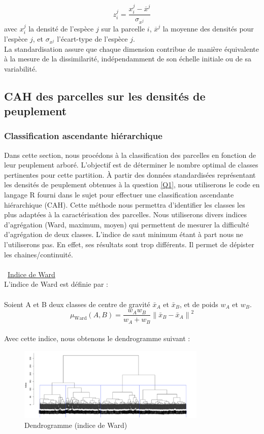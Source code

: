 \documentclass{article}
\begin{document}
\[
z_i^j = \frac{x_i^j - \overline{x}^j}{\sigma_{x^j}}
\]
avec \( x_i^j \) la densité de l’espèce \( j \) sur la parcelle \( i \), \( \overline{x}^j \) la moyenne des densités pour l’espèce \( j \), et \( \sigma_{x^j} \) l’écart-type de l’espèce \( j \).\\
La standardisation assure que chaque dimension contribue de manière équivalente à la mesure de la dissimilarité, indépendamment de son échelle initiale ou de sa variabilité.
\subsection{CAH des parcelles sur les densités de peuplement}
\subsubsection{Classification ascendante hiérarchique}
Dans cette section, nous procédons à la classification des parcelles en fonction de leur peuplement arboré. L'objectif est de déterminer le nombre optimal de classes pertinentes pour cette partition. À partir des données standardisées représentant les densités de peuplement obtenues à la question \ref{Q1}, nous utiliserons le code en langage R fourni dans le sujet pour effectuer une classification ascendante hiérarchique (CAH). Cette méthode nous permettra d’identifier les classes les plus adaptées à la caractérisation des parcelles.
Nous utiliserons divers indices d'agrégation (Ward, maximum, moyen) qui permettent de mesurer la difficulté d'agrégation de deux classes.
L'indice de saut minimum étant à part nous ne l'utiliserons pas. En effet, ses résultats sont trop différents. Il permet de dépister les chaines/continuité.
\\
\\
\textbullet\ \underline{Indice de Ward}
\\
L'indice de Ward est définie par :
\\
\\
Soient A et B deux classes de centre de gravité $\bar{x}_A$ et $\bar{x}_B$, et de poids $w_A$ et $w_B$.
\[
\mu_\text{Ward} (A,B) = \frac{w_A w_B}{w_A + w_B} \left\lVert \bar{x}_B - \bar{x}_A \right\lVert ^2
\]
\\
Avec cette indice, nous obtenons le dendrogramme suivant :
\\
\begin{figure}[H]
    \centering
    \includegraphics[width=0.8\textwidth]{wardC.png}
    \caption{Dendrogramme (indice de Ward)}
    \label{fig:Ward} 
\end{figure}
\end{document}
